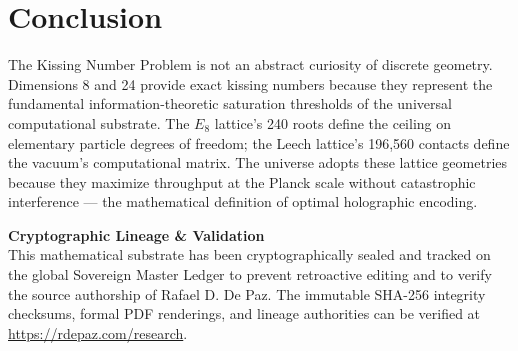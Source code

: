 \documentclass[12pt, a4paper]{article}
\theoremstyle{plain}
\theoremstyle{definition}
\theoremstyle{remark}
\begin{document}
\section{Conclusion}

The Kissing Number Problem is not an abstract curiosity of discrete geometry. Dimensions 8 and 24 provide exact kissing numbers because they represent the fundamental information-theoretic saturation thresholds of the universal computational substrate. The $E_8$ lattice's 240 roots define the ceiling on elementary particle degrees of freedom; the Leech lattice's 196,560 contacts define the vacuum's computational matrix. The universe adopts these lattice geometries because they maximize throughput at the Planck scale without catastrophic interference --- the mathematical definition of optimal holographic encoding.

\vspace{2em}
\noindent\hrulefill
\vspace{1em}

\noindent\textbf{Cryptographic Lineage \& Validation}\\
This mathematical substrate has been cryptographically sealed and tracked on the global Sovereign Master Ledger to prevent retroactive editing and to verify the source authorship of Rafael D. De Paz. The immutable SHA-256 integrity checksums, formal PDF renderings, and lineage authorities can be verified at \url{https://rdepaz.com/research}.



\end{document}
